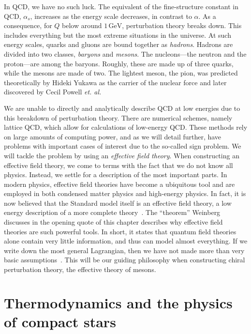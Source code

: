 In QCD, we have no such luck.
The equivalent of the fine-structure constant in QCD, $\alpha_s$, increases as the energy scale decreases, in contrast to $\alpha$.
As a consequence, for $Q$ below around $1\,\text{GeV}$, perturbation theory breaks down.
This includes everything but the most extreme situations in the universe.
At such energy scales, quarks and gluons are bound together as \emph{hadrons}.
Hadrons are divided into two classes, \emph{baryons} and \emph{mesons}.
The nucleons---the neutron and the proton---are among the baryons.
Roughly, these are made up of three quarks, while the mesons are made of two.
The lightest meson, the pion, was predicted theoretically by Hideki Yukawa as the carrier of the nuclear force and later discovered by Cecil Powell \emph{et. al.}~\autocite{griffithsIntroductionElementaryParticles2008}

We are unable to directly and analytically describe QCD at low energies due to this breakdown of perturbation theory.
There are numerical schemes, namely lattice QCD, which allow for calculations of low-energy QCD.
These methods rely on large amounts of computing power, and as we will detail further, have problems with important cases of interest due to the so-called sign problem.
We will tackle the problem by using an \emph{effective field theory}.
When constructing an effective field theory, we come to terms with the fact that we do not know all physics.
Instead, we settle for a description of the most important parts.
In modern physics, effective field theories have become a ubiquitous tool and are employed in both condensed matter physics and high-energy physics.
In fact, it is now believed that the Standard model itself is an effective field theory, a low energy description of a more complete theory~\autocite{pencoIntroductionEffectiveField2020,weinbergDevelopmentEffectiveField2021}.
The ``theorem'' Weinberg discusses in the opening quote of this chapter describes why effective field theories are such powerful tools.
In short, it states that quantum field theories alone contain very little information, and thus can model almost everything.
If we write down the most general Lagrangian, then we have not made more than very basic assumptions~\autocite{weinbergPhenomenologicalLagrangians1979a}.
This will be our guiding philosophy when constructing chiral perturbation theory, the effective theory of mesons.




\section{Thermodynamics and the physics of compact stars}

